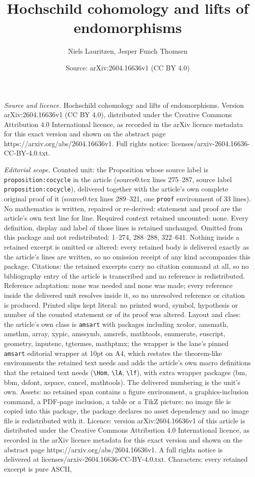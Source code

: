 \documentclass[10pt,a4paper]{amsart}
\title[Hochschild cohomology and lifts of endomorphisms]{Hochschild cohomology and lifts of endomorphisms}
\author{Niels Lauritzen, Jesper Funch Thomsen}
\date{Source: arXiv:2604.16636v1 (CC BY 4.0)}
\begin{document}
\maketitle

\noindent\emph{Source and licence.} Hochschild cohomology and lifts of endomorphisms. Version arXiv:2604.16636v1 (CC BY 4.0), distributed under the Creative Commons Attribution 4.0 International licence, as recorded in the arXiv licence metadata for this exact version and shown on the abstract page https://arxiv.org/abs/2604.16636v1. Full rights notice: licenses/arxiv-2604.16636-CC-BY-4.0.txt.\par\smallskip

\noindent\textit{Editorial scope.} Counted unit: the Proposition whose source label is \texttt{proposition:cocycle} in the article (source0.tex lines 275--287, source label \texttt{proposition:cocycle}), delivered together with the article's own complete original proof of it (source0.tex lines 289--321, one \texttt{proof} environment of 33 lines). No mathematics is written, repaired or re-derived: statement and proof are the article's own text line for line. Required context retained uncounted: none. Every definition, display and label of those lines is retained unchanged. Omitted from this package and not redistributed: 1--274, 288--288, 322--641. Nothing inside a retained excerpt is omitted or altered: every retained body is delivered exactly as the article's lines are written, so no omission receipt of any kind accompanies this package. Citations: the retained excerpts carry no citation command at all, so no bibliography entry of the article is transcribed and no reference is redistributed. Reference adaptation: none was needed and none was made; every reference inside the delivered unit resolves inside it, so no unresolved reference or citation is produced. Printed slips kept literal: no printed word, symbol, hypothesis or number of the counted statement or of its proof was altered. Layout and class: the article's own class is \texttt{amsart} with packages including xcolor, amsmath, amsthm, array, xypic, amssymb, amsrefs, mathtools, enumerate, euscript, geometry, inputenc, tgtermes, mathptmx; the wrapper is the lane's pinned \texttt{amsart} editorial wrapper at 10pt on A4, which restates the theorem-like environments the retained text needs and adds the article's own macro definitions that the retained text needs (\texttt{\textbackslash Hom}, \texttt{\textbackslash lA}, \texttt{\textbackslash lf}), with extra wrapper packages (bm, bbm, dsfont, xspace, cancel, mathtools). The delivered numbering is the unit's own. Assets: no retained span contains a figure environment, a graphics-inclusion command, a PDF-page inclusion, a table or a TikZ picture; no image file is copied into this package, the package declares no asset dependency and no image file is redistributed with it. Licence: version arXiv:2604.16636v1 of this article is distributed under the Creative Commons Attribution 4.0 International licence, as recorded in the arXiv licence metadata for this exact version and shown on the abstract page https://arxiv.org/abs/2604.16636v1. A full rights notice is delivered at licenses/arxiv-2604.16636-CC-BY-4.0.txt. Characters: every retained excerpt is pure ASCII, 
\end{document}
